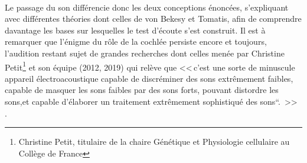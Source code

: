 \\
Le passage du son différencie donc les deux conceptions énoncées, s'expliquant avec différentes 
théories  dont celles de von  Bekesy et 
Tomatis, afin de comprendre 
davantage les bases sur lesquelles le test d'écoute s'est construit.
Il est à 
remarquer que l'énigme du 
rôle de la cochlée persiste encore et toujours, l'audition restant 
sujet de grandes 
recherches dont celles menée par Christine Petit\footnote{Christine Petit, titulaire de la 
	chaire Génétique et
	Physiologie cellulaire au Collège de France} et son équipe (2012, 
2019) %
qui relève que 
<<\,c'est une sorte de minuscule appareil électroacoustique capable
de discréminer des sons extrêmement faibles, capable de masquer
	les sons faibles par des sons forts, pouvant distordre les
	sons,et capable d'élaborer un traitement extrêmement
	sophistiqué des sons``. \,>> \autocite{petit_lookscience}.%

